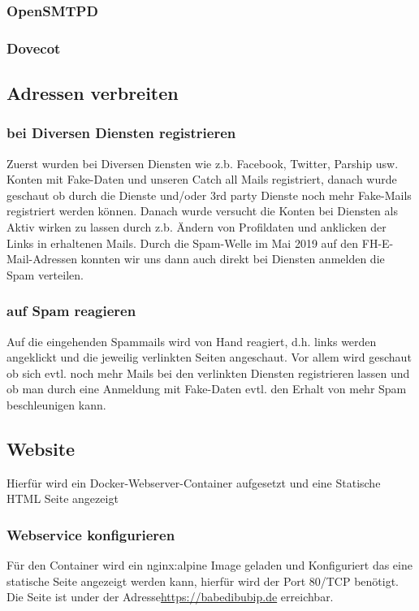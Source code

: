 \documentclass[a4paper,11pt,singlespacing]{article}
\begin{document}
		\subsubsection{OpenSMTPD}\label{OpenRelayOpenSMTPD}
		\subsubsection{Dovecot}\label{OpenRelayDovecot}

	\subsection{Adressen verbreiten}\label{sec:UmsetzungAdressenverbreiten}
		\subsubsection{bei Diversen Diensten registrieren}\label{}
			Zuerst wurden bei Diversen Diensten wie z.b. Facebook, Twitter, Parship usw. Konten mit Fake-Daten und unseren Catch all Mails registriert, danach wurde geschaut ob durch die Dienste und/oder 3rd party Dienste noch mehr Fake-Mails registriert werden können. Danach wurde versucht die Konten bei Diensten als Aktiv wirken zu lassen durch z.b. Ändern von Profildaten und anklicken der Links in erhaltenen Mails. Durch die Spam-Welle im Mai 2019 auf den FH-E-Mail-Adressen konnten wir uns dann auch direkt bei Diensten anmelden die Spam verteilen.
		\subsubsection{auf Spam reagieren}\label{}
			Auf die eingehenden Spammails wird von Hand reagiert, d.h. links werden angeklickt und die jeweilig verlinkten Seiten angeschaut. Vor allem wird geschaut ob sich evtl. noch mehr Mails bei den verlinkten Diensten registrieren lassen und ob man durch eine Anmeldung mit Fake-Daten evtl. den Erhalt von mehr Spam beschleunigen kann.
	
	\subsection{Website}\label{sec:UmsetzungWebsite}
		Hierfür wird ein Docker-Webserver-Container aufgesetzt und eine Statische HTML Seite angezeigt
		\subsubsection{Webservice konfigurieren}\label{}
			Für den Container wird ein nginx:alpine Image geladen und Konfiguriert das eine statische Seite angezeigt werden kann, hierfür wird der Port 80/TCP benötigt.
			Die Seite ist under der Adresse\url{https://babedibubip.de} erreichbar.
\end{document}
